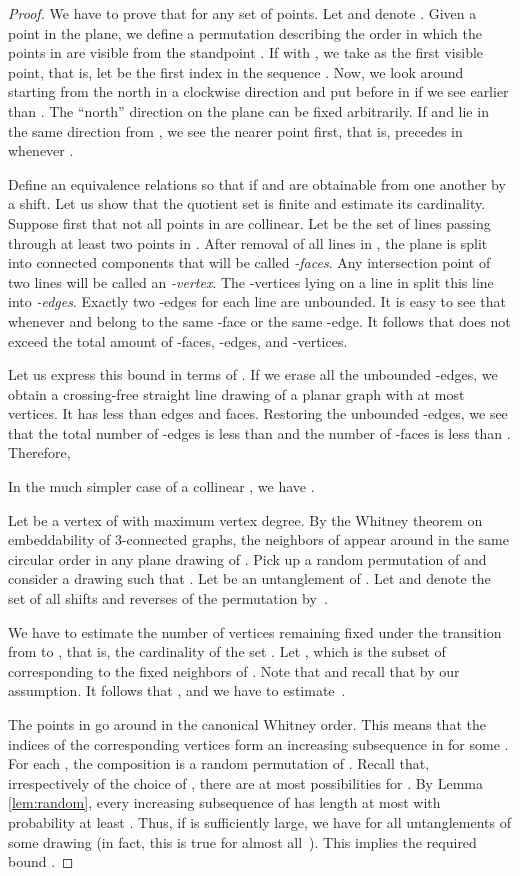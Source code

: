 \documentclass[reqno,12pt]{amsart}
\begin{document}
\begin{proof}
We have to prove that  for any set  of  points.
Let  and denote .
Given a point  in the plane, we define a permutation 
 describing the order in which the points in  are visible from the 
standpoint . 
If  with , we take  as the first visible point, that is,
let  be the first index in the sequence . Now, we look around starting
from the north in a clockwise direction and put  before  in 
if we see  earlier than . The ``north'' direction on the plane can be fixed 
arbitrarily. If  and  lie in the same direction from ,
we see the nearer point first, that is,  precedes  in 
whenever .

Define an equivalence relations  so that  if  and 
are obtainable from one another by a shift.
Let us show that the quotient set  is finite and estimate its cardinality.
Suppose first that not all points in  are collinear.
Let  be the set of lines passing through at least
two points in . After removal of all lines in , the plane
is split into connected components that will be called \emph{-faces}.
Any intersection point of two lines will be called an \emph{-vertex}.
The -vertices lying on a line in  split this line into \emph{-edges}.
Exactly two -edges for each line are unbounded.
It is easy to see that  whenever  and  belong to the same
-face or the same -edge. It follows that 
does not exceed the total amount of -faces, -edges, and -vertices.

Let us express this bound in terms of . If we erase
all the unbounded -edges, we obtain a crossing-free straight line drawing of
a planar graph with at most  vertices. It has less than
 edges and  faces. Restoring the unbounded
-edges, we see that the total number of -edges is less than   
and the number of -faces is less than . Therefore,

In the much simpler case of a collinear , we have .


Let  be a vertex of  with maximum vertex degree. By the Whitney theorem
on embeddability of 3-connected graphs, the neighbors of  appear around 
in the same circular order  in any plane drawing of .
Pick up a random permutation  of  and consider
a drawing  such that .
Let  be an untanglement of . Let  and denote
the set of all shifts and reverses
of the permutation  by~.

We have to estimate the number of vertices remaining fixed 
under the transition from  to , that is, the cardinality
of the set .
Let , which is the subset of 
corresponding to the fixed neighbors of . Note that
 and recall that  by our assumption.
It follows that , and we have to estimate~.

The points in  go around  in the canonical Whitney order.
This means that the indices of the corresponding vertices
form an increasing subsequence in  for some .
For each , the composition  is a random permutation of .
Recall that, irrespectively of the choice of ,
there are at most  possibilities for .
By Lemma \ref{lem:random}, every increasing subsequence of 
has length at most  with probability at least .
Thus, if  is sufficiently large, we have  for all
untanglements  of some drawing  (in fact, this is true
for almost all~). This implies the required bound .
\end{proof}
\end{document}
